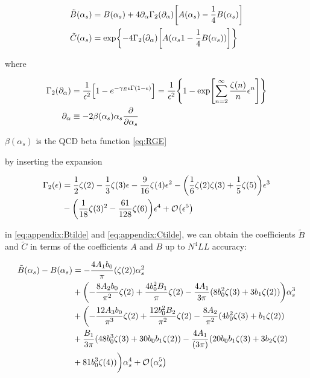 \documentclass[../main.tex]{subfiles}
\begin{document}
\begin{align}
\tilde{B}(\alpha_s) &= B(\alpha_s) + 4 \partial_\alpha \Gamma_2(\partial_\alpha) \qty[A(\alpha_s)-\frac{1}{4} B(\alpha_s)] \label{eq:appendix:Btilde}\\ 
\tilde{C}(\alpha_s) &= \exp{-4\Gamma_2(\partial_\alpha) \qty[A(\alpha_s1-\frac{1}{4} B(\alpha_s))]} \label{eq:appendix:Ctilde}
\end{align}

where 

\begin{align}
    \Gamma_2(\partial_\alpha) &= \frac{1}{\epsilon^2}\qty[1-e^{-\gamma_E \epsilon \Gamma(1-\epsilon)}] = \frac{1}{\epsilon^2}\qty{1-\exp[\sum_{n=2}^\infty \frac{\zeta(n)}{n}\epsilon^n] }\\
    \partial_\alpha &\equiv -2\beta(\alpha_s)\alpha_s \pdv{\alpha_s}
\end{align}

$\beta(\alpha_s)$ is the QCD beta function \cref{eq:RGE}

by inserting the expansion 

\begin{align}
    \begin{split}
    \Gamma_2(\epsilon) &= \frac{1}{2}\zeta(2) -\frac{1}{3}\zeta(3) \epsilon - \frac{9}{16}\zeta(4) \epsilon^2 - \qty(\frac{1}{6}\zeta(2)\zeta(3)+ \frac{1}{5}\zeta(5))\epsilon^3 \\
    &- \qty(\frac{1}{18}\zeta(3)^2 - \frac{61}{128}\zeta(6))\epsilon^4 + \order{\epsilon^5}   
    \end{split}
\end{align}

in \cref{eq:appendix:Btilde} and \cref{eq:appendix:Ctilde}, we can obtain the coefficients $\tilde{B}$ and $\tilde{C}$ in terms of the coefficients $A$ and $B$ up to $N^4LL$ accuracy: 

\begin{align}
    \begin{split}
    \tilde{B}(\alpha_s) - B(\alpha_s) &= -\frac{4 A_1 b_0}{\pi} (\zeta(2)) \alpha_s^2 \\
    &+ \qty(-\frac{8 A_2 b_0}{\pi^2} \zeta(2) + \frac{4 b_0^2 B_1}{\pi} \zeta(2) - \frac{4 A_1}{3\pi}(8 b_0^2 \zeta(3) + 3 b_1 \zeta(2))) \alpha_s^3 \\
    &+ \biggl(-\frac{12 A_3 b_0}{\pi^3} \zeta(2) + \frac{12 b_0^2 B_2}{\pi^2} \zeta(2) - \frac{8 A_2}{\pi^2} (4 b_0^2 \zeta(3) + b_1 \zeta(2)) \\
    &+ \frac{B_1}{3 \pi}(48 b_0^3 \zeta(3) +  30 b_0 b_1 \zeta(2)) - \frac{4 A_1}{(3 \pi)} (20 b_0 b_1 \zeta(3) + 3 b_2 \zeta(2) \\
    &+ 81 b_0^3 \zeta(4)) \biggr) \alpha_s^4 + \order{\alpha_s^5}
    \end{split}
\end{align}
\end{document}
